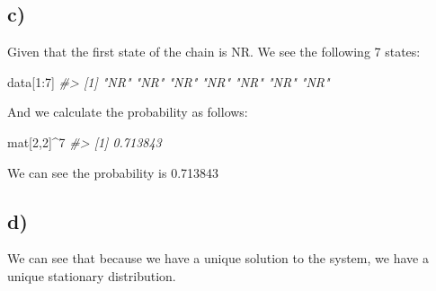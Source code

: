 \documentclass[
]{article}
\newenvironment{Shaded}{\begin{snugshade}}{\end{snugshade}}
\newcommand{\CommentTok}[1]{\textcolor[rgb]{0.56,0.35,0.01}{\textit{#1}}}
\newcommand{\DecValTok}[1]{\textcolor[rgb]{0.00,0.00,0.81}{#1}}
\newcommand{\NormalTok}[1]{#1}
\newcommand{\SpecialCharTok}[1]{\textcolor[rgb]{0.00,0.00,0.00}{#1}}
\begin{document}
\newpage

\hypertarget{c}{%
\subsection{c)}\label{c}}

Given that the first state of the chain is NR. We see the following 7
states:

\begin{Shaded}
\begin{Highlighting}[]
\NormalTok{data[}\DecValTok{1}\SpecialCharTok{:}\DecValTok{7}\NormalTok{]}
\CommentTok{\#\textgreater{} [1] "NR" "NR" "NR" "NR" "NR" "NR" "NR"}
\end{Highlighting}
\end{Shaded}

And we calculate the probability as follows:

\begin{Shaded}
\begin{Highlighting}[]
\NormalTok{mat[}\DecValTok{2}\NormalTok{,}\DecValTok{2}\NormalTok{]}\SpecialCharTok{\^{}}\DecValTok{7}
\CommentTok{\#\textgreater{} [1] 0.713843}
\end{Highlighting}
\end{Shaded}

We can see the probability is 0.713843

\hypertarget{d}{%
\subsection{d)}\label{d}}

We can see that because we have a unique solution to the system, we have
a unique stationary distribution.
\end{document}
